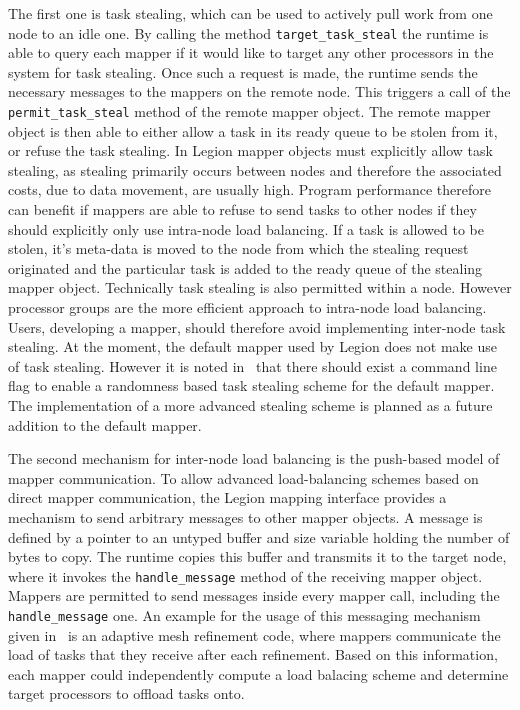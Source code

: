 \documentclass{article}      %
\begin{document}
The first one is task stealing, which can be used to actively pull work from one node to an idle one. By calling the method \lstinline{target_task_steal} the runtime is able to query each mapper if it would like to target any other processors in the system for task stealing. Once such a request is made, the runtime sends the necessary messages to the mappers on the remote node. This triggers a call of the \lstinline{permit_task_steal} method of the remote mapper object. The remote mapper object is then able to either allow a task in its ready queue to be stolen from it, or refuse the task stealing. In Legion mapper objects must explicitly allow task stealing, as stealing primarily occurs between nodes and therefore the associated costs, due to data movement, are usually high. Program performance therefore can benefit if mappers are able to refuse to send tasks to other nodes if they should explicitly only use intra-node load balancing. If a task is allowed to be stolen, it's meta-data is moved to the node from which the stealing request originated and the particular task is added to the ready queue of the stealing mapper object. Technically task stealing is also permitted within a node. However processor groups are the more efficient approach to intra-node load balancing. Users, developing a mapper, should therefore avoid implementing inter-node task stealing. At the moment, the default mapper used by Legion does not make use of task stealing. However it is noted in~\cite{BauerThesis} that there should exist a command line flag to enable a randomness based task stealing scheme for the default mapper. The implementation of a more advanced stealing scheme is planned as a future addition to the default mapper.

The second mechanism for inter-node load balancing is the push-based model of mapper communication. To allow advanced load-balancing schemes based on direct mapper communication, the Legion mapping interface provides a mechanism to send arbitrary messages to other mapper objects. A message is defined by a pointer to an untyped buffer and size variable holding the number of bytes to copy. The runtime copies this buffer and transmits it to the target node, where it invokes the \lstinline{handle_message} method of the receiving mapper object. Mappers are permitted to send messages inside every mapper call, including the \lstinline{handle_message} one. An example for the usage of this messaging mechanism given in~\cite{BauerThesis} is an adaptive mesh refinement code, where mappers communicate the load of tasks that they receive after each refinement. Based on this information, each mapper could independently compute a load balacing scheme and determine target processors to offload tasks onto.
\end{document}
